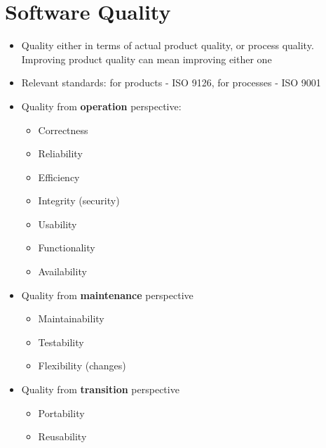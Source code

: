 \documentclass{article}
\begin{document}
\section{Software Quality}
\begin{itemize}
    \item Quality either in terms of actual product quality, or process quality. Improving product quality can mean improving either one
    
    \item Relevant standards: for products - ISO 9126, for processes - ISO 9001
    
    \item Quality from \textbf{operation} perspective:
    \begin{itemize}
        \item Correctness
        
        \item Reliability
        
        \item Efficiency
        
        \item Integrity (security)
        
        \item Usability
        
        \item Functionality
        
        \item Availability
    \end{itemize}
    
    \item Quality from \textbf{maintenance} perspective
    \begin{itemize}
        \item Maintainability
        
        \item Testability
        
        \item Flexibility (changes)
    \end{itemize}
    
    \item Quality from \textbf{transition} perspective
    \begin{itemize}
        \item Portability
        
        \item Reusability
        

\end{itemize}
\end{itemize}
\end{document}
